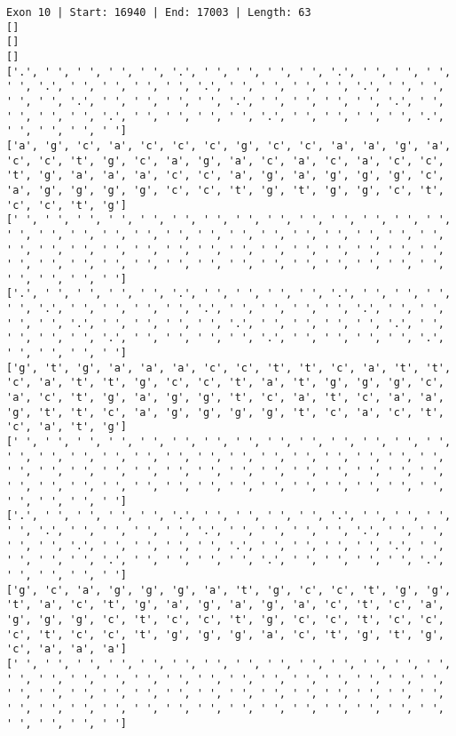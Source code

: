 \documentclass{article}
\begin{document}
\begin{Verbatim}
Exon 10 | Start: 16940 | End: 17003 | Length: 63
[]
[]
[]
['.', ' ', ' ', ' ', ' ', '.', ' ', ' ', ' ', ' ', '.', ' ', ' ', ' ', ' ', '.', ' ', ' ', ' ', ' ', '.', ' ', ' ', ' ', ' ', '.', ' ', ' ', ' ', ' ', '.', ' ', ' ', ' ', ' ', '.', ' ', ' ', ' ', ' ', '.', ' ', ' ', ' ', ' ', '.', ' ', ' ', ' ', ' ', '.', ' ', ' ', ' ', ' ', '.', ' ', ' ', ' ', ' ']
['a', 'g', 'c', 'a', 'c', 'c', 'c', 'g', 'c', 'c', 'a', 'a', 'g', 'a', 'c', 'c', 't', 'g', 'c', 'a', 'g', 'a', 'c', 'a', 'c', 'a', 'c', 'c', 't', 'g', 'a', 'a', 'a', 'c', 'c', 'a', 'g', 'a', 'g', 'g', 'g', 'c', 'a', 'g', 'g', 'g', 'g', 'c', 'c', 't', 'g', 't', 'g', 'g', 'c', 't', 'c', 'c', 't', 'g']
[' ', ' ', ' ', ' ', ' ', ' ', ' ', ' ', ' ', ' ', ' ', ' ', ' ', ' ', ' ', ' ', ' ', ' ', ' ', ' ', ' ', ' ', ' ', ' ', ' ', ' ', ' ', ' ', ' ', ' ', ' ', ' ', ' ', ' ', ' ', ' ', ' ', ' ', ' ', ' ', ' ', ' ', ' ', ' ', ' ', ' ', ' ', ' ', ' ', ' ', ' ', ' ', ' ', ' ', ' ', ' ', ' ', ' ', ' ', ' ']
['.', ' ', ' ', ' ', ' ', '.', ' ', ' ', ' ', ' ', '.', ' ', ' ', ' ', ' ', '.', ' ', ' ', ' ', ' ', '.', ' ', ' ', ' ', ' ', '.', ' ', ' ', ' ', ' ', '.', ' ', ' ', ' ', ' ', '.', ' ', ' ', ' ', ' ', '.', ' ', ' ', ' ', ' ', '.', ' ', ' ', ' ', ' ', '.', ' ', ' ', ' ', ' ', '.', ' ', ' ', ' ', ' ']
['g', 't', 'g', 'a', 'a', 'a', 'c', 'c', 't', 't', 'c', 'a', 't', 't', 'c', 'a', 't', 't', 'g', 'c', 'c', 't', 'a', 't', 'g', 'g', 'g', 'c', 'a', 'c', 't', 'g', 'a', 'g', 'g', 't', 'c', 'a', 't', 'c', 'a', 'a', 'g', 't', 't', 'c', 'a', 'g', 'g', 'g', 'g', 't', 'c', 'a', 'c', 't', 'c', 'a', 't', 'g']
[' ', ' ', ' ', ' ', ' ', ' ', ' ', ' ', ' ', ' ', ' ', ' ', ' ', ' ', ' ', ' ', ' ', ' ', ' ', ' ', ' ', ' ', ' ', ' ', ' ', ' ', ' ', ' ', ' ', ' ', ' ', ' ', ' ', ' ', ' ', ' ', ' ', ' ', ' ', ' ', ' ', ' ', ' ', ' ', ' ', ' ', ' ', ' ', ' ', ' ', ' ', ' ', ' ', ' ', ' ', ' ', ' ', ' ', ' ', ' ']
['.', ' ', ' ', ' ', ' ', '.', ' ', ' ', ' ', ' ', '.', ' ', ' ', ' ', ' ', '.', ' ', ' ', ' ', ' ', '.', ' ', ' ', ' ', ' ', '.', ' ', ' ', ' ', ' ', '.', ' ', ' ', ' ', ' ', '.', ' ', ' ', ' ', ' ', '.', ' ', ' ', ' ', ' ', '.', ' ', ' ', ' ', ' ', '.', ' ', ' ', ' ', ' ', '.', ' ', ' ', ' ', ' ']
['g', 'c', 'a', 'g', 'g', 'g', 'a', 't', 'g', 'c', 'c', 't', 'g', 'g', 't', 'a', 'c', 't', 'g', 'a', 'g', 'a', 'g', 'a', 'c', 't', 'c', 'a', 'g', 'g', 'g', 'c', 't', 'c', 'c', 't', 'g', 'c', 'c', 't', 'c', 'c', 'c', 't', 'c', 'c', 't', 'g', 'g', 'g', 'a', 'c', 't', 'g', 't', 'g', 'c', 'a', 'a', 'a']
[' ', ' ', ' ', ' ', ' ', ' ', ' ', ' ', ' ', ' ', ' ', ' ', ' ', ' ', ' ', ' ', ' ', ' ', ' ', ' ', ' ', ' ', ' ', ' ', ' ', ' ', ' ', ' ', ' ', ' ', ' ', ' ', ' ', ' ', ' ', ' ', ' ', ' ', ' ', ' ', ' ', ' ', ' ', ' ', ' ', ' ', ' ', ' ', ' ', ' ', ' ', ' ', ' ', ' ', ' ', ' ', ' ', ' ', ' ', ' ']

\end{Verbatim}
\end{document}
